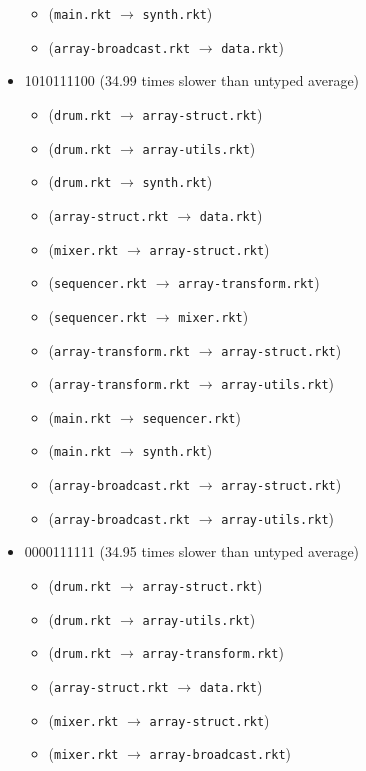 \documentclass{article}
\newcommand{\mono}[1]{\texttt{#1}}
\begin{document}
\begin{itemize}
\begin{itemize}
  \item (\mono{main.rkt} $\rightarrow$ \mono{synth.rkt})
  \item (\mono{array-broadcast.rkt} $\rightarrow$ \mono{data.rkt})
  \end{itemize}
\item 1010111100 (34.99 times slower than untyped average)
  \begin{itemize}
  \item (\mono{drum.rkt} $\rightarrow$ \mono{array-struct.rkt})
  \item (\mono{drum.rkt} $\rightarrow$ \mono{array-utils.rkt})
  \item (\mono{drum.rkt} $\rightarrow$ \mono{synth.rkt})
  \item (\mono{array-struct.rkt} $\rightarrow$ \mono{data.rkt})
  \item (\mono{mixer.rkt} $\rightarrow$ \mono{array-struct.rkt})
  \item (\mono{sequencer.rkt} $\rightarrow$ \mono{array-transform.rkt})
  \item (\mono{sequencer.rkt} $\rightarrow$ \mono{mixer.rkt})
  \item (\mono{array-transform.rkt} $\rightarrow$ \mono{array-struct.rkt})
  \item (\mono{array-transform.rkt} $\rightarrow$ \mono{array-utils.rkt})
  \item (\mono{main.rkt} $\rightarrow$ \mono{sequencer.rkt})
  \item (\mono{main.rkt} $\rightarrow$ \mono{synth.rkt})
  \item (\mono{array-broadcast.rkt} $\rightarrow$ \mono{array-struct.rkt})
  \item (\mono{array-broadcast.rkt} $\rightarrow$ \mono{array-utils.rkt})
  \end{itemize}
\item 0000111111 (34.95 times slower than untyped average)
  \begin{itemize}
  \item (\mono{drum.rkt} $\rightarrow$ \mono{array-struct.rkt})
  \item (\mono{drum.rkt} $\rightarrow$ \mono{array-utils.rkt})
  \item (\mono{drum.rkt} $\rightarrow$ \mono{array-transform.rkt})
  \item (\mono{array-struct.rkt} $\rightarrow$ \mono{data.rkt})
  \item (\mono{mixer.rkt} $\rightarrow$ \mono{array-struct.rkt})
  \item (\mono{mixer.rkt} $\rightarrow$ \mono{array-broadcast.rkt})

\end{itemize}
\end{itemize}
\end{document}
